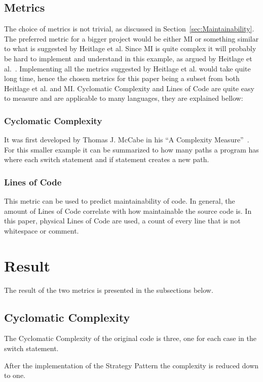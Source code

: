 \documentclass[conference, a4paper]{IEEEtran}
\begin{document}
\subsection{Metrics}
The choice of metrics is not trivial, as discussed in Section~\ref{sec:Maintainability}. The preferred metric for a bigger project would be either MI or something similar to what is suggested by Heitlage et al. Since MI is quite complex it will probably be hard to implement and understand in this example, as argued by Heitlage et al.~\cite{bibitem:Maintainability}. Implementing all the metrics suggested by Heitlage et al. would take quite long time, hence the chosen metrics for this paper being a subset from both Heitlage et al. and MI. Cyclomatic Complexity and Lines of Code are quite easy to measure and are applicable to many languages, they are explained bellow:

\subsubsection{Cyclomatic Complexity}
It was first developed by Thomas J. McCabe in his ``A Complexity Measure''~\cite{bibitem:CC}. For this smaller example it can be summarized to how many paths a program has where each switch statement and if statement creates a new path.

\subsubsection{Lines of Code}
This metric can be used to predict maintainability of code. In general, the amount of Lines of Code correlate with how maintainable the source code is. In this paper, physical Lines of Code are used, a count of every line that is not whitespace or comment.

\section{Result}
The result of the two metrics is presented in the subsections below.

\subsection{Cyclomatic Complexity}
The Cyclomatic Complexity of the original code is three, one for each case in the switch statement.

After the implementation of the Strategy Pattern the complexity is reduced down to one.
\end{document}
